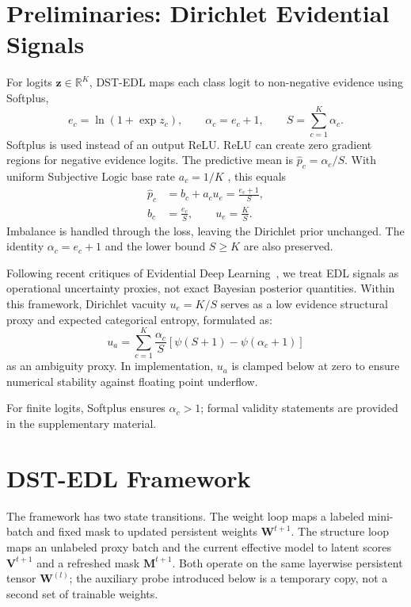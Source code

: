 \documentclass[letterpaper]{article}
\newcommand{\R}{\mathbb{R}}
\newif\ifwithappendix
\begin{document}
\section{Preliminaries: Dirichlet Evidential Signals}\label{sec:math}

For logits $\bm{z}\in\R^K$, DST-EDL maps each class logit to non-negative evidence using Softplus,
\begin{equation}\label{eq:softplus}
    e_c=\ln(1+\exp z_c),\qquad
    \alpha_c=e_c+1,\qquad
    S=\sum_{c=1}^K\alpha_c .
\end{equation}
Softplus is used instead of an output ReLU. ReLU can create zero gradient regions for negative evidence logits. The predictive mean is $\hat p_c=\alpha_c/S$. With uniform Subjective Logic base rate $a_c=1/K$ \cite{josang2016subjective}, this equals
\begin{equation}\label{eq:p_hat}
\begin{aligned}
    \hat p_c&=b_c+a_cu_e=\frac{e_c+1}{S},\\
    b_c&=\frac{e_c}{S},\qquad
    u_e=\frac{K}{S}.
\end{aligned}
\end{equation}
Imbalance is handled through the loss, leaving the Dirichlet prior unchanged. The identity $\alpha_c=e_c+1$ and the lower bound $S\ge K$ are also preserved.

Following recent critiques of Evidential Deep Learning~\cite{shen2024mirage}, we treat EDL signals as operational uncertainty proxies, not exact Bayesian posterior quantities. Within this framework, Dirichlet vacuity $u_e=K/S$ serves as a low evidence structural proxy and expected categorical entropy, formulated as:
\begin{equation}\label{eq:u_a}
    u_a = \sum_{c=1}^K \frac{\alpha_c}{S} \left[\psi(S + 1) - \psi(\alpha_c + 1)\right]
\end{equation}
as an ambiguity proxy. In implementation, $u_a$ is clamped below at zero to ensure numerical stability against floating point underflow.

For finite logits, Softplus ensures $\alpha_c>1$; formal validity statements are provided in the \ifwithappendix Appendix~\ref{app:proofs}\else supplementary material\fi.

\section{DST-EDL Framework}\label{sec:methodology}

The framework has two state transitions. The weight loop maps a labeled mini-batch and fixed mask to updated persistent weights $\bm W^{t+1}$. The structure loop maps an unlabeled proxy batch and the current effective model to latent scores $\bm V^{t+1}$ and a refreshed mask $\bm M^{t+1}$. Both operate on the same layerwise persistent tensor $\bm W^{(l)}$; the auxiliary probe introduced below is a temporary copy, not a second set of trainable weights.
\end{document}
